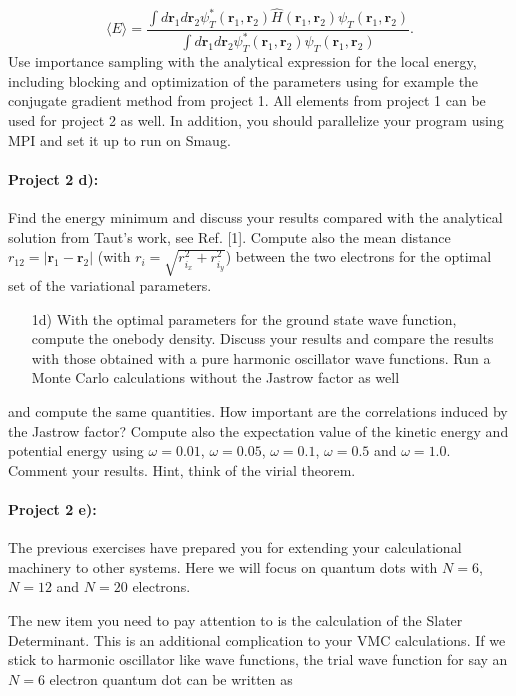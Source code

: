 \documentclass[%
oneside,                 %
final,                   %
10pt]{article}
\begin{document}
\begin{equation}
   \langle E \rangle =
   \frac{\int d\bm{r}_1d\bm{r}_2\psi^{\ast}_T(\bm{r}_1,\bm{r}_2)\hat{H}(\bm{r}_1,\bm{r}_2)\psi_T(\bm{r}_1,\bm{r}_2)}
        {\int d\bm{r}_1d\bm{r}_2\psi^{\ast}_T(\bm{r}_1,\bm{r}_2)\psi_T(\bm{r}_1,\bm{r}_2)}.
\end{equation}
Use importance sampling with the analytical expression for the local energy, including blocking and 
optimization of the parameters using for example the conjugate gradient method from project 1. 
All elements from project 1 can be used for project 2 as well.
In addition, you should parallelize your program using MPI and set it up to run on Smaug.

\paragraph{Project 2 d):}
Find the  energy minimum and discuss your results compared with the analytical solution from
Taut's work, see Ref. [1]. Compute also the mean distance
$r_{12}=\vert \bm{r}_1-\bm{r}_2\vert$ (with $r_i = \sqrt{r_{i_x}^2+r_{i_y}^2}$) between the two electrons for the optimal set of the variational parameters.
\begin{itemize}
  \item [1d)]  With the optimal parameters for the ground state wave function, compute the onebody density. Discuss your results and compare the results with those obtained with a pure harmonic oscillator wave functions. Run a Monte Carlo calculations without the Jastrow factor as well
\end{itemize}

\noindent
and compute the same quantities. How important are the correlations induced by the Jastrow factor?
Compute also the expectation value of the kinetic energy and potential energy using $\omega=0.01$, $\omega=0.05$,
$\omega=0.1$, $\omega=0.5$ and $\omega=1.0$. Comment your results. Hint, think of the virial theorem. 


\paragraph{Project 2 e):}
The previous exercises have prepared you for extending your calculational machinery  to other systems.
Here we will focus on quantum dots with $N=6$, $N=12$ and $N=20$ electrons.

The new item you need to pay attention to is the calculation of the Slater Determinant. This is an additional complication
to your VMC calculations.
If we stick to harmonic oscillator like wave functions,
the trial wave function for say an $N=6$ electron quantum dot can be written as
\end{document}
